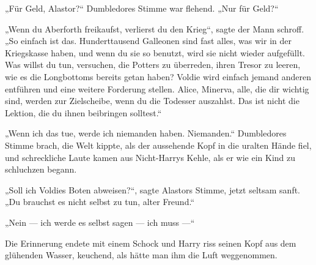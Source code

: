 \begin{em}
„Für Geld, Alastor?“ Dumbledores Stimme war flehend.
„Nur für Geld?“

„Wenn du Aberforth freikaufst, verlierst du den Krieg“, sagte der Mann schroff.
„So einfach ist das. Hunderttausend Galleonen sind fast alles, was wir in der Kriegskasse haben, und wenn du sie so benutzt, wird sie nicht wieder aufgefüllt. Was willst du tun, versuchen, die Potters zu überreden, ihren Tresor zu leeren, wie es die Longbottoms bereits getan haben? Voldie wird einfach jemand anderen entführen und eine weitere Forderung stellen. Alice, Minerva, alle, die dir wichtig sind, werden zur Zielscheibe, wenn du die Todesser auszahlst. Das ist nicht die Lektion, die du ihnen beibringen solltest.“

„Wenn ich das tue, werde ich niemanden haben. Niemanden.“ Dumbledores Stimme brach, die Welt kippte, als der aussehende Kopf in die uralten Hände fiel, und schreckliche Laute kamen aus Nicht-Harrys Kehle, als er wie ein Kind zu schluchzen begann.

„Soll ich Voldies Boten abweisen?“, sagte Alastors Stimme, jetzt seltsam sanft.
„Du brauchst es nicht selbst zu tun, alter Freund.“

„Nein — ich werde es selbst sagen — ich muss —“
\end{em}

\later

Die Erinnerung endete mit einem Schock und Harry riss seinen Kopf aus dem glühenden Wasser, keuchend, als hätte man ihm die Luft weggenommen.

